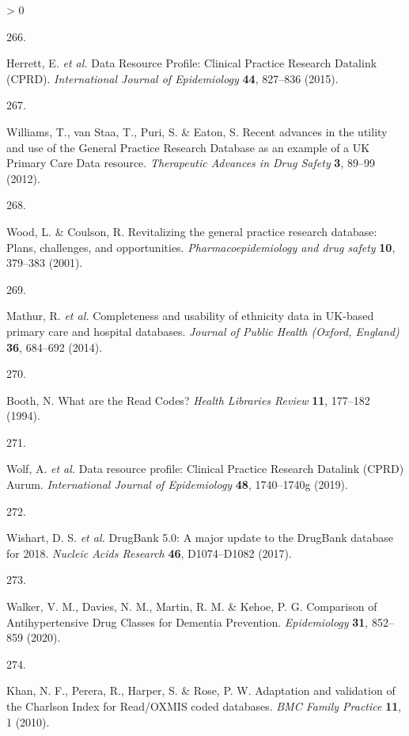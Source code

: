 \documentclass[a4paper, twoside]{templates/ociamthesis}
\newlength{\cslhangindent}
\newlength{\csllabelwidth}
\newenvironment{CSLReferences}[3] %
 {%
  \setlength{\parindent}{0pt}
  \ifodd #1 \everypar{\setlength{\hangindent}{\cslhangindent}}\ignorespaces\fi
  \ifnum #2 > 0
  \setlength{\parskip}{#2\baselineskip}
  \fi
 }%
 {}
\newcommand{\CSLLeftMargin}[1]{\parbox[t]{\maxof{\widthof{#1}}{\csllabelwidth}}{#1}}
\newcommand{\CSLRightInline}[1]{\parbox[t]{\linewidth - \csllabelwidth}{#1}}
\begin{document}
\begin{CSLReferences}{0}{0}
\leavevmode\hypertarget{ref-herrett2015}{}%
\CSLLeftMargin{266. }
\CSLRightInline{Herrett, E. \emph{et al.} Data {Resource Profile}: Clinical {Practice Research Datalink} ({CPRD}). \emph{International Journal of Epidemiology} \textbf{44}, 827--836 (2015).}

\leavevmode\hypertarget{ref-williams2012}{}%
\CSLLeftMargin{267. }
\CSLRightInline{Williams, T., van Staa, T., Puri, S. \& Eaton, S. Recent advances in the utility and use of the {General Practice Research Database} as an example of a {UK Primary Care Data} resource. \emph{Therapeutic Advances in Drug Safety} \textbf{3}, 89--99 (2012).}

\leavevmode\hypertarget{ref-wood2001revitalizing}{}%
\CSLLeftMargin{268. }
\CSLRightInline{Wood, L. \& Coulson, R. Revitalizing the general practice research database: Plans, challenges, and opportunities. \emph{Pharmacoepidemiology and drug safety} \textbf{10}, 379--383 (2001).}

\leavevmode\hypertarget{ref-mathur2014}{}%
\CSLLeftMargin{269. }
\CSLRightInline{Mathur, R. \emph{et al.} Completeness and usability of ethnicity data in {UK}-based primary care and hospital databases. \emph{Journal of Public Health (Oxford, England)} \textbf{36}, 684--692 (2014).}

\leavevmode\hypertarget{ref-booth1994}{}%
\CSLLeftMargin{270. }
\CSLRightInline{Booth, N. What are the {Read Codes}? \emph{Health Libraries Review} \textbf{11}, 177--182 (1994).}

\leavevmode\hypertarget{ref-wolf2019}{}%
\CSLLeftMargin{271. }
\CSLRightInline{Wolf, A. \emph{et al.} Data resource profile: Clinical {Practice Research Datalink} ({CPRD}) {Aurum}. \emph{International Journal of Epidemiology} \textbf{48}, 1740--1740g (2019).}

\leavevmode\hypertarget{ref-wishart2017}{}%
\CSLLeftMargin{272. }
\CSLRightInline{Wishart, D. S. \emph{et al.} {DrugBank} 5.0: A major update to the {DrugBank} database for 2018. \emph{Nucleic Acids Research} \textbf{46}, D1074--D1082 (2017).}

\leavevmode\hypertarget{ref-walker2020}{}%
\CSLLeftMargin{273. }
\CSLRightInline{Walker, V. M., Davies, N. M., Martin, R. M. \& Kehoe, P. G. Comparison of {Antihypertensive Drug Classes} for {Dementia Prevention}. \emph{Epidemiology} \textbf{31}, 852--859 (2020).}

\leavevmode\hypertarget{ref-khan2010}{}%
\CSLLeftMargin{274. }
\CSLRightInline{Khan, N. F., Perera, R., Harper, S. \& Rose, P. W. Adaptation and validation of the {Charlson Index} for {Read}/{OXMIS} coded databases. \emph{BMC Family Practice} \textbf{11}, 1 (2010).}


\end{CSLReferences}
\end{document}
